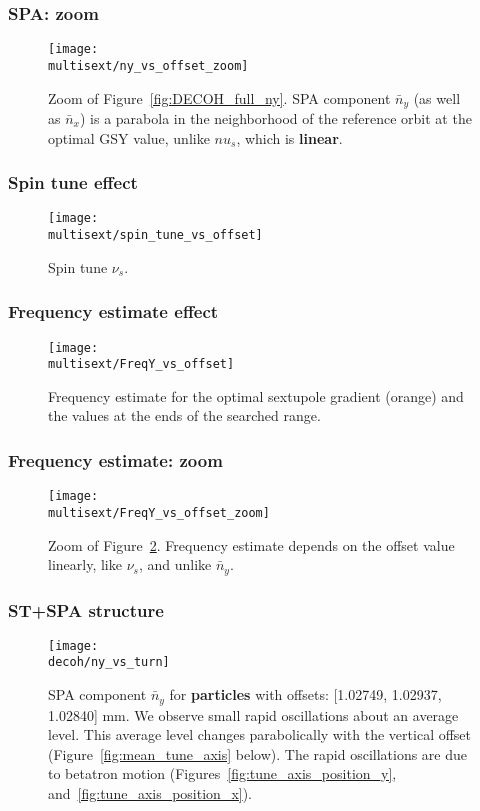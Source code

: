 \documentclass{beamer}
\newcommand{\home}{\string~}
\newcommand{\Artem}{\home/REPOS/COSYINF/img/Artem}
\newcommand{\multisext}{\Artem/multisext_test}
\newcommand{\decoh}{\Artem/decoherence_frequency_dependence}
\begin{document}
\begin{frame}\frametitle{SPA: zoom}
  \begin{figure}[H]
    \texttt{[image: \\multisext/ny\_vs\_offset\_zoom]}
    \caption{Zoom of Figure~\ref{fig:DECOH_full_ny}. SPA component $\bar
      n_y$ (as well as $\bar n_x$) is a parabola in the neighborhood of the reference orbit at
      the optimal GSY value, unlike $nu_s$, which is \textbf{linear}.}
  \end{figure}
\end{frame}

\begin{frame}\frametitle{Spin tune effect}
  \begin{figure}[H]
    \centering
    \texttt{[image: \\multisext/spin\_tune\_vs\_offset]}
    \caption{Spin tune $\nu_s$.\label{fig:SpinTune_vs_Y0_GSY}}
  \end{figure}
\end{frame}
\begin{frame}\frametitle{Frequency estimate effect}
  \begin{figure}[H]
    \centering
    \texttt{[image: \\multisext/FreqY\_vs\_offset]}
    \caption{Frequency estimate for the optimal sextupole gradient (orange) and the values at the ends of the searched range.\label{fig:FreqY_vs_offset}}
  \end{figure}
\end{frame}
\begin{frame}\frametitle{Frequency estimate: zoom}
  \begin{figure}[H]
    \texttt{[image: \\multisext/FreqY\_vs\_offset\_zoom]}
    \caption{Zoom of Figure~\ref{fig:FreqY_vs_offset}. Frequency estimate depends on the offset value linearly,
      like  $\nu_s$, and unlike $\bar n_y$.}
  \end{figure}
\end{frame}

\begin{frame}\frametitle{ST+SPA structure}
  \begin{figure}[H]
  \centering
  \texttt{[image: \\decoh/ny\_vs\_turn]}
  \caption{SPA component $\bar n_y$ for \textbf{particles} with offsets:
    [1.02749, 1.02937, 1.02840] mm. We observe small rapid oscillations about
    an average level. This average level changes parabolically with the vertical
    offset (Figure~\ref{fig:mean_tune_axis} below). The rapid oscillations are
    due to betatron motion (Figures~\ref{fig:tune_axis_position_y},
    and~\ref{fig:tune_axis_position_x}).\label{fig:ny_vs_turn}}
\end{figure}
\end{frame}
\end{document}
